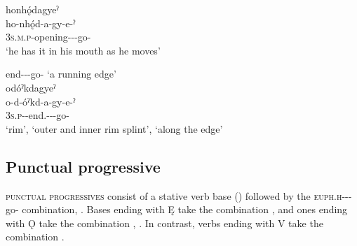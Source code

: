 \ex honhǫ́dagyeˀ\\
\gll ho-nhǫ́d-a-gy-e-ˀ\\
 \textsc{3s.m.p}-opening-{\joinerA-\progressive}-go-{\stative}\\
\glt `he has it in his mouth as he moves'

\z
\z

\ea\label{ex:purpprogsufex6}   end-{\joinerA}-{\progressive}-go-{\stative} ‘a running edge’\\
odóˀkdagyeˀ \\
\gll o-d-óˀkd-a-gy-e-ˀ\\
 \textsc{3s.p}-{\semireflexive}-end.{\stative}-{\joinerA-\progressive}-go-{\stative}\\
\glt ‘rim’, ‘outer and inner rim splint’, `along the edge'
\z


\subsection{Punctual progressive} \label{ch:Punctual progressive}

\textsc{punctual progressives} consist of a stative verb base () followed by the  \textsc{euph.h}-{\joiner}-{\progressive}-go-{\punctual} combination, . Bases ending with Ę take the  combination , and ones ending with Ǫ take the  combination , . In contrast, verbs ending with V take the  combination .

